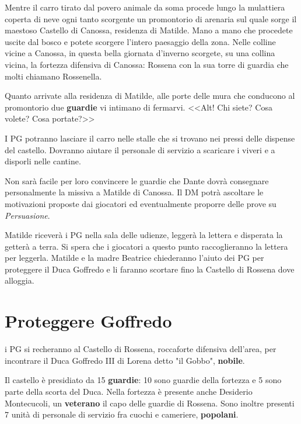 \documentclass[letterpaper,twocolumn,openany,nodeprecatedcode]{dndbook}
\begin{document}
\begin{DndReadAloud}
Mentre il carro tirato dal povero animale da soma procede lungo la mulattiera coperta di neve ogni tanto scorgente un promontorio di arenaria sul quale sorge il maestoso Castello di Canossa, residenza di Matilde. Mano a mano che procedete uscite dal bosco e potete scorgere l'intero paesaggio della zona. Nelle colline vicine a Canossa, in questa bella giornata d'inverno scorgete, su una collina vicina, la fortezza difensiva di Canossa: Rossena con la sua torre di guardia che molti chiamano Rossenella.

Quanto arrivate alla residenza di Matilde, alle porte delle mura che conducono al promontorio due \textbf{guardie} vi intimano di fermarvi. <<Alt! Chi siete? Cosa volete? Cosa portate?>>
\end{DndReadAloud}

I PG potranno lasciare il carro nelle stalle che si trovano nei pressi delle dispense del castello. Dovranno aiutare il personale di servizio a scaricare i viveri e a disporli nelle cantine.

Non sarà facile per loro convincere le guardie che Dante dovrà consegnare personalmente la missiva a Matilde di Canossa. Il DM potrà ascoltare le motivazioni proposte dai giocatori ed eventualmente proporre delle prove su \textit{Persuasione}.

Matilde riceverà i PG nella sala delle udienze, leggerà la lettera e disperata la getterà a terra. Si spera che i giocatori a questo punto raccoglieranno la lettera per leggerla. Matilde e la madre Beatrice chiederanno l'aiuto dei PG per proteggere il Duca Goffredo e li faranno scortare fino la Castello di Rossena dove alloggia.

\chapter{Proteggere Goffredo}
 i PG si recheranno al Castello di Rossena, roccaforte difensiva dell'area, per incontrare il Duca Goffredo III di Lorena detto "il Gobbo", \textbf{nobile}.

Il castello è presidiato da 15 \textbf{guardie}: 10 sono guardie della fortezza e 5 sono parte della scorta del Duca. Nella fortezza è presente anche Desiderio Montecucoli, un \textbf{veterano} il capo delle guardie di Rossena. Sono inoltre presenti 7 unità di personale di servizio fra cuochi e cameriere, \textbf{popolani}.
\end{document}
